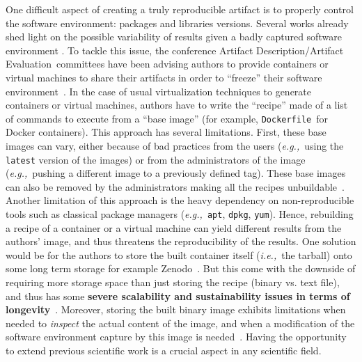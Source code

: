 \documentclass[sigconf,natbib=false]{acmart}
\newcommand{\ie}{\emph{i.e.,}}
\newcommand{\eg}{\emph{e.g.,}}
\newcommand{\ad}{Artifact Description}
\newcommand{\aeval}{Artifact Evaluation}
\newcommand{\adae}{\ad/\aeval}
\newcommand{\df}{\texttt{Dockerfile}}
\newcommand{\todo}[1]{{\color{red}{TODO: #1}}}
\begin{document}
One difficult aspect of creating a truly reproducible artifact is to properly control the software environment: packages and libraries versions.
Several works already shed light on the possible variability of results given a badly captured software environment \cite{mytkowicz_producing_nodate, sokolowski2024impact}.
To tackle this issue, the conference \adae\ committees have been advising authors to provide containers or virtual machines to share their artifacts in order to ``freeze'' their software environment~\cite{eurosys25, aetips, csartifacts}.
In the case of usual virtualization techniques to generate containers or virtual machines, authors have to write the ``recipe'' made of a list of commands to execute from a ``base image'' (for example, \df\ for Docker containers).
This approach has several limitations.
First, these base images can vary, either because of bad practices from the users (\eg\ using the \texttt{latest} version of the images) or from the administrators of the image (\eg\ pushing a different image to a previously defined tag).
These base images can also be removed by the administrators making all the recipes unbuildable~\cite{nvidia_cuda_lifetime}.
Another limitation of this approach is the heavy dependency on non-reproducible tools such as classical package managers (\eg\ \texttt{apt}, \texttt{dpkg}, \texttt{yum}).
Hence, rebuilding a recipe of a container or a virtual machine can yield different results from the authors' image, and thus threatens the reproducibility of the results.
One solution would be for the authors to store the built container itself (\ie\ the tarball) onto some long term storage for example Zenodo~\cite{zenodo}.
But this come with the downside of requiring more storage space than just storing the recipe (binary vs. text file), and thus has some \textbf{severe scalability and sustainability issues in terms of longevity}~\cite{monroe2023preservation, guilloteau2024longevity}.
Moreover, storing the built binary image exhibits limitations when needed to \emph{inspect} the actual content of the image, and when a modification of the software environment capture by this image is needed~\cite{mercier2018considering}.
Having the opportunity to extend previous scientific work is a crucial aspect in any scientific field.


\end{document}

